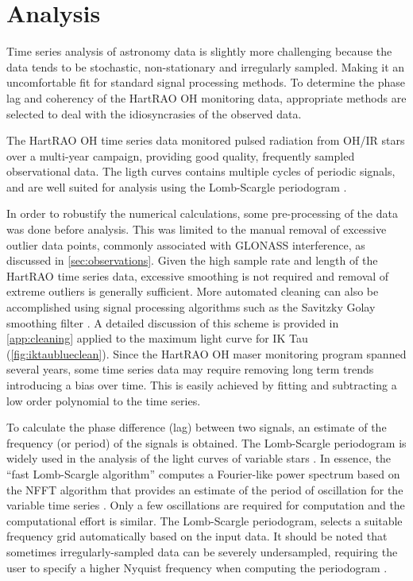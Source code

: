 \section{Analysis}
\label{sec:analysis}

Time series analysis of astronomy data is slightly more challenging because the data tends to be stochastic, non-stationary and irregularly sampled.
Making it an uncomfortable fit for standard signal processing methods.
To determine the phase lag and coherency of the HartRAO OH monitoring data, appropriate methods are selected to deal with the idiosyncrasies of the observed data.

The HartRAO OH time series data monitored pulsed radiation from OH/IR stars over a multi-year campaign, providing good quality, frequently sampled observational data.
The ligth curves contains multiple cycles of periodic signals, and are well suited for analysis using the Lomb-Scargle periodogram
\citep{2018ApJS..236...16V}.

In order to robustify the numerical calculations, some pre-processing of the data was done before analysis.
This was limited to the manual removal of excessive outlier data points, commonly associated with GLONASS interference, as discussed in \cref{sec:observations}.
Given the high sample rate and length of the HartRAO time series data, excessive smoothing is not required and removal of extreme outliers is generally sufficient.
More automated cleaning can also be accomplished using signal processing algorithms such as the Savitzky Golay smoothing filter
\citep{1964AnaCh..36.1627S}.
A detailed discussion of this scheme is provided in \cref{app:cleaning} applied to the maximum light curve for IK Tau (\cref{fig:iktaublueclean}).
Since the HartRAO OH maser monitoring program spanned several years, some time series data may require removing long term trends introducing a bias over time.
This is easily achieved by fitting and subtracting a low order polynomial to the time series.

To calculate the phase difference (lag) between two signals, an estimate of the frequency (or period) of the signals is obtained.
The Lomb-Scargle periodogram is widely used in the analysis of the light curves of variable stars
\citep{1990ApJ...348..700K}.
In essence, the ``fast Lomb-Scargle algorithm'' computes a Fourier-like power spectrum based on the NFFT algorithm that provides an estimate of the period of oscillation for the variable time series
\citep{1989ApJ...338..277P,2018ApJS..236...16V}.
Only a few oscillations are required for computation and the computational effort is similar.
The Lomb-Scargle periodogram, selects a suitable frequency grid automatically based on the input data.
It should be noted that sometimes irregularly-sampled data can be severely undersampled, requiring the user to specify a higher Nyquist frequency when computing the periodogram
\citep{2006MNRAS.371.1390K}.

